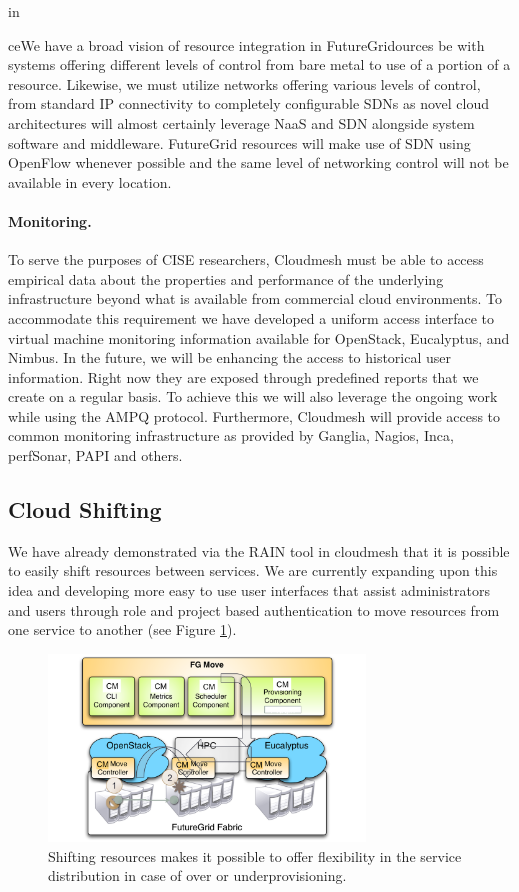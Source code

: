 \documentclass{article}
\begin{document}
in{ceWe have a broad vision of resource integration in FutureGridources be with systems offering different levels of control from bare metal to use of a portion of a resource. Likewise, we must utilize networks offering various levels of control, from standard IP connectivity to completely configurable SDNs as novel cloud architectures will almost certainly leverage NaaS and SDN alongside system software and middleware. FutureGrid resources will make use of SDN using OpenFlow whenever possible and the same level of networking control will not be available in every location.

\paragraph{Monitoring.}

To serve the purposes of CISE researchers, Cloudmesh must be able to access empirical data about the properties and performance of the underlying infrastructure beyond what is available from commercial cloud environments. To accommodate this requirement we have developed a uniform access interface to virtual machine monitoring information available for OpenStack, Eucalyptus, and Nimbus. In the future, we will be enhancing the access to historical user information. Right now they are exposed through predefined reports that we create on a regular basis. To achieve this we will also leverage the ongoing work while using the AMPQ protocol. Furthermore, Cloudmesh will provide access to common monitoring infrastructure as provided by Ganglia, Nagios, Inca, perfSonar, PAPI and others.


\subsection{Cloud Shifting}

We have already demonstrated via the RAIN tool in cloudmesh that it is possible to easily shift resources between services. We are currently expanding upon this idea and developing more easy to use user interfaces that assist administrators and users through role and project based authentication to move resources from one service to another (see Figure \ref{F:shift}).

\begin{figure}[htb]
  \centering
    \includegraphics[width=0.75\textwidth]{images/shift2.pdf}
  \caption{Shifting resources makes it possible to offer flexibility
    in the service distribution in case of over or underprovisioning.}\label{F:shift}
\end{figure}

}
\end{document}
